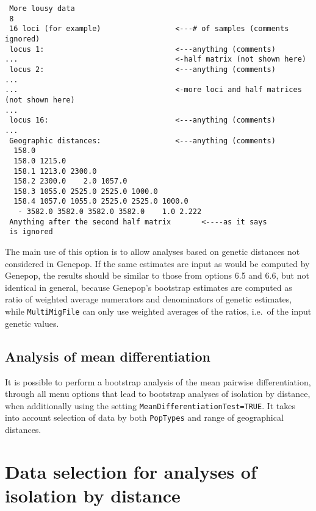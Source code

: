 \documentclass[
  12pt,
]{book}
\begin{document}
\begin{verbatim}
 More lousy data
 8
 16 loci (for example)                 <---# of samples (comments ignored)
 locus 1:                              <---anything (comments)
...                                    <-half matrix (not shown here)
 locus 2:                              <---anything (comments)
...
...                                    <-more loci and half matrices (not shown here)
...
 locus 16:                             <---anything (comments)
...
 Geographic distances:                 <---anything (comments)
  158.0
  158.0 1215.0
  158.1 1213.0 2300.0
  158.2 2300.0    2.0 1057.0
  158.3 1055.0 2525.0 2525.0 1000.0
  158.4 1057.0 1055.0 2525.0 2525.0 1000.0
   - 3582.0 3582.0 3582.0 3582.0    1.0 2.222
 Anything after the second half matrix       <----as it says
 is ignored
\end{verbatim}

The main use of this option is to allow analyses based on genetic distances not considered in Genepop. If the same estimates are input as would be computed by Genepop, the results should be similar to those from options 6.5 and 6.6, but not identical in general, because Genepop's bootstrap estimates are computed as ratio of weighted average numerators and denominators of genetic estimates, while \texttt{MultiMigFile} can only use weighted averages of the ratios, i.e.~of the input genetic values.

\hypertarget{analysis-of-mean-differentiation}{%
\subsection{Analysis of mean differentiation}\label{analysis-of-mean-differentiation}}

It is possible to perform a bootstrap analysis of the mean pairwise differentiation, through all menu options that lead to bootstrap analyses of isolation by distance, when additionally using the setting \texttt{MeanDifferentiationTest=TRUE}. It takes into account selection of data by both \texttt{PopTypes} and range of geographical distances.

\hypertarget{data-selection-for-analyses-of-isolation-by-distance}{%
\section{Data selection for analyses of isolation by distance}\label{data-selection-for-analyses-of-isolation-by-distance}}
\end{document}
